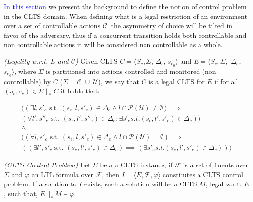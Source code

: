 \textcolor{blue}{In this section} we present the background to define the notion of control problem in the CLTS domain.  When defining what is a legal restriction of an environment over a set of controllable actions $\mathcal{C}$, the asymmetry of choice will be tilted in favor of the adversary, thus if a concurrent transition holds both controllable and non controllable actions it will be considered non controllable as a whole.

\begin{definition}
	\label{def:legal_clts} \emph{(Legality w.r.t. $E$ and $\mathcal{C}$)} 
	Given CLTS $C = \langle S_c, \Sigma$, $\Delta_c$, $s_{c_0}\rangle$ and $E = \langle S_e,\Sigma,$ $\Delta_e,$ $s_{e_0}\rangle$, where $\Sigma$ is partitioned into actions controlled and monitored (non controllable) by $C$ ($\Sigma=\mathcal{C} \; \cup \;\mathcal{U}$), we say that $C$ is a legal CLTS for $E$ if for all $(s_e,s_c) \in E \parallel_* C$ it holds that:
	
	\begin{gather*}
	((\exists l, s'_{e} \text{ s.t. } (s_e,l, s'_e) \in \Delta_e \wedge l \cap \mathcal{P}(\mathcal{U}) \neq \emptyset) \implies \\
	 (\forall l',s''_e \text{ s.t. } (s_e, l',s''_e) \in \Delta_e : \exists s'_c { s.t. } (s_c,l',s'_c) \in \Delta_c)) \\
	 \wedge\\
	 ((\forall l, s'_{e} \text{ s.t. } (s_e,l, s'_e) \in \Delta_e \wedge l \cap \mathcal{P}(\mathcal{U}) = \emptyset)\implies \\
	 ((\exists l',s'_c \text{ s.t. } (s_c, l',s'_c) \in \Delta_c) \implies (\exists s'_e { s.t. } (s_e,l',s'_e) \in \Delta_e)))
	 \end{gather*}
	
\end{definition}

\begin{definition}
	\label{def:clts_control_problem} \emph{(CLTS Control Problem)} 
	Let $E$ be a a CLTS instance, if $\mathcal{F}$ is a set of fluents over $\Sigma$ and $\varphi$ an LTL formula over $\mathcal{F}$, then $I = \langle E, \mathcal{F}, \varphi \rangle$ constitutes a CLTS control problem. If a solution to $I$ exists, such a solution will be a CLTS $M$, legal w.r.t. $E$, such that, $E \parallel_* M \models \varphi$.
\end{definition}

